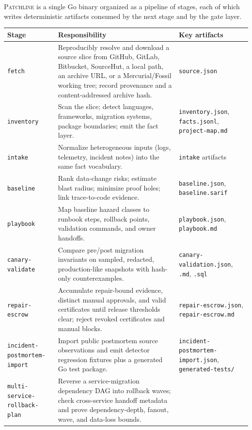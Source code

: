 \documentclass[11pt]{article}
\newcommand{\tool}{\textsc{Patchline}}
\newcommand{\code}[1]{\texttt{#1}}
\begin{document}
\tool{} is a single Go binary organized as a pipeline of stages, each of which writes deterministic
artifacts consumed by the next stage and by the gate layer.

\begin{longtable}{>{\raggedright\arraybackslash}p{2.3cm}>{\raggedright\arraybackslash}p{8.2cm}>{\raggedright\arraybackslash}p{3.4cm}}
\toprule
\textbf{Stage} & \textbf{Responsibility} & \textbf{Key artifacts} \\
\midrule
\endhead
\code{fetch} & Reproducibly resolve and download a source slice from GitHub, GitLab, Bitbucket,
SourceHut, a local path, an archive URL, or a Mercurial/Fossil working tree; record provenance and a
content-addressed archive hash. & \code{source.json} \\
\code{inventory} & Scan the slice; detect languages, frameworks, migration systems, package
boundaries; emit the fact layer. & \code{inventory.json}, \code{facts.jsonl}, \code{project-map.md} \\
\code{intake} & Normalize heterogeneous inputs (logs, telemetry, incident notes) into the same fact
vocabulary. & \code{intake} artifacts \\
\code{baseline} & Rank data-change risks; estimate blast radius; minimize proof holes; link
trace-to-code evidence. & \code{baseline.json}, \code{baseline.sarif} \\
\code{playbook} & Map baseline hazard classes to runbook steps, rollback points, validation commands,
and owner handoffs. & \code{playbook.json}, \code{playbook.md} \\
\code{canary-validate} & Compare pre/post migration invariants on sampled, redacted, production-like
snapshots with hash-only counterexamples. & \code{canary-validation.json}, \code{.md}, \code{.sql} \\
\code{repair-escrow} & Accumulate repair-bound evidence, distinct manual approvals, and valid
certificates until release thresholds clear; reject revoked certificates and manual blocks. &
\code{repair-escrow.json}, \code{repair-escrow.md} \\
\code{incident-postmortem-import} & Import public postmortem source observations and emit detector
regression fixtures plus a generated Go test package. & \code{incident-postmortem-import.json},
\code{generated-tests/} \\
\code{multi-service-rollback-plan} & Reverse a service-migration dependency DAG into rollback waves;
check cross-service handoff metadata and prove dependency-depth, fanout, wave, and data-loss bounds. &

\end{longtable}
\end{document}
